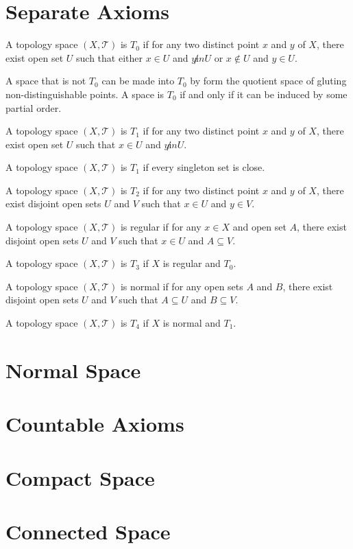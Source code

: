\section{Separate Axioms}
\begin{defi}[$T_0$]
A topology space $(X, \mathcal{T})$ is $T_0$ if for any two distinct point $x$ and $y$ of $X$,
there exist open set $U$ such that either $x \in U$ and $y \not in U$ or $x \notin U$
and $y \in U$.
\end{defi}
\begin{rem}
A space that is not $T_0$ can be made into $T_0$ by form the quotient space of
gluting non-distinguishable points.
A space is $T_0$ if and only if it can be induced by some partial order.
\end{rem}
\begin{defi}[$T_1$]
A topology space $(X, \mathcal{T})$ is $T_1$ if for any two distinct point $x$ and $y$ of $X$,
there exist open set $U$ such that $x \in U$ and $y \not in U$.
\end{defi}
\begin{rem}
A topology space $(X, \mathcal{T})$ is $T_1$ if every singleton set is close.
\end{rem}
\begin{defi}[$T_2$, Hausdorff]
A topology space $(X, \mathcal{T})$ is $T_2$ if for any two distinct point $x$ and $y$ of $X$,
there exist disjoint open sets $U$ and $V$ such that $x \in U$ and $y \in V$.
\end{defi}
\begin{defi}[Regular]
A topology space $(X, \mathcal{T})$ is regular if for any $x \in X$ and open set $A$,
there exist disjoint open sets $U$ and $V$ such that $x \in U$ and $A \subseteq V$.
\end{defi}
\begin{defi}[$T_3$]
A topology space $(X, \mathcal{T})$ is $T_3$ if $X$ is regular and $T_0$.
\end{defi}
\begin{defi}[normal]
A topology space $(X, \mathcal{T})$ is normal if for any open sets $A$ and $B$,
there exist disjoint open sets $U$ and $V$ such that $A \subseteq U$ and $B \subseteq V$.
\end{defi}
\begin{defi}[$T_4$]
A topology space $(X, \mathcal{T})$ is $T_4$ if $X$ is normal and $T_1$.
\end{defi}
\section{Normal Space}
\begin{pro}
\end{pro}

\section{Countable Axioms}
\section{Compact Space}
\section{Connected Space}
